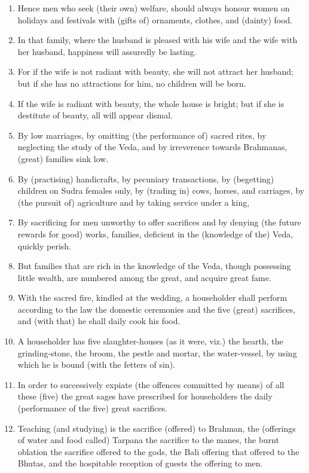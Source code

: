 \begin{enumerate}
\item Hence men who seek (their own) welfare, should always honour women on holidays and festivals with (gifts of) ornaments, clothes, and (dainty) food.
\item In that family, where the husband is pleased with his wife and the wife with her husband, happiness will assuredly be lasting.
\item For if the wife is not radiant with beauty, she will not attract her husband; but if she has no attractions for him, no children will be born.
\item If the wife is radiant with beauty, the whole house is bright; but if she is destitute of beauty, all will appear dismal.
\item By low marriages, by omitting (the performance of) sacred rites, by neglecting the study of the Veda, and by irreverence towards Brahmanas, (great) families sink low.
\item By (practising) handicrafts, by pecuniary transactions, by (begetting) children on Sudra females only, by (trading in) cows, horses, and carriages, by (the pursuit of) agriculture and by taking service under a king,
\item By sacrificing for men unworthy to offer sacrifices and by denying (the future rewards for good) works, families, deficient in the (knowledge of the) Veda, quickly perish.
\item But families that are rich in the knowledge of the Veda, though possessing little wealth, are numbered among the great, and acquire great fame.
\item With the sacred fire, kindled at the wedding, a householder shall perform according to the law the domestic ceremonies and the five (great) sacrifices, and (with that) he shall daily cook his food.
\item A householder has five slaughter-houses (as it were, viz.) the hearth, the grinding-stone, the broom, the pestle and mortar, the water-vessel, by using which he is bound (with the fetters of sin).
\item In order to successively expiate (the offences committed by means) of all these (five) the great sages have prescribed for householders the daily (performance of the five) great sacrifices.
\item Teaching (and studying) is the sacrifice (offered) to Brahman, the (offerings of water and food called) Tarpana the sacrifice to the manes, the burnt oblation the sacrifice offered to the gods, the Bali offering that offered to the Bhutas, and the hospitable reception of guests the offering to men.

\end{enumerate}
